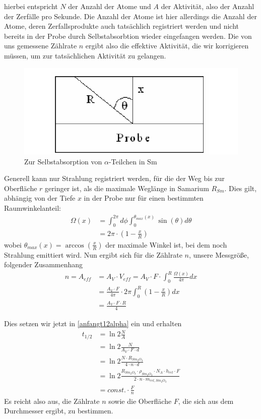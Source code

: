 hierbei entspricht $N$ der Anzahl der Atome und $A$ der Aktivität, also der Anzahl der Zerfälle pro Sekunde. Die Anzahl der Atome ist hier allerdings die Anzahl der Atome, deren Zerfallsprodukte auch tatsächlich registriert werden und nicht bereits in der Probe durch Selbstabsorbtion wieder eingefangen werden. Die von uns gemessene Zählrate $n$ ergibt also die effektive Aktivität, die wir korrigieren müssen, um zur tatsächlichen Aktivität zu gelangen.

\begin{figure}
 \centering \includegraphics[width=0.5\linewidth]{Bilder/korrektur_alpha.png}
 \caption{Zur Selbstabsorption von $\alpha$-Teilchen in Sm}
\end{figure}

Generell kann nur Strahlung registriert werden, für die der Weg bis zur Oberfläche $r$ geringer ist, als die maximale Weglänge in Samarium $R_{Sm}$. Dies gilt, abhängig von der Tiefe $x$ in der Probe nur für einen bestimmten Raumwinkelanteil:
\begin{align}
 \Omega \left( x \right) &= \int_0^{2\pi}d\phi \int_0^{\theta_{max}(x)} \sin \left( \theta \right) d \theta \\
 & = 2 \pi \cdot \left( 1 - \frac{x}{R} \right)
\end{align}
wobei $\theta_{max}\left( x \right) = \arccos \left( \frac{x}{R} \right)$ der maximale Winkel ist, bei dem noch Strahlung emittiert wird. Nun ergibt sich für die Zählrate $n$, unsere Messgröße, folgender Zusammenhang
\begin{align}
 n = A_{eff} &= A_V \cdot V_{eff} = A_V \cdot F \cdot \int_0^R \frac{\Omega \left( x \right)}{4\pi} dx \\
   & = \frac{A_V \cdot F}{4 \pi} \cdot 2 \pi \int_0^R \left( 1 - \frac{x}{R} \right) dx \\
   & = \frac{A_V \cdot F \cdot R}{4}
\end{align}

Dies setzen wir jetzt in \ref{anfangt12alpha} ein und erhalten
\begin{align}
 t_{1/2} & = \ln 2 \frac{N}{A} \\
         & = \ln 2 \frac{N}{A_V \cdot F \cdot d} \\
         & = \ln 2 \frac{N \cdot R_{Sm_2O_3}}{4 \cdot n \cdot d} \\
         & = \ln 2 \frac{R_{Sm_2O_3} \cdot \rho_{Sm_2O_3} \cdot N_A \cdot h_{rel} \cdot F }{2 \cdot n \cdot m_{rel,Sm_2O_3}} \\
         & = const. \cdot \frac{F}{n}
\end{align}
Es reicht also aus, die Zählrate $n$ sowie die Oberfläche $F$, die sich aus dem Durchmesser ergibt, zu bestimmen.


